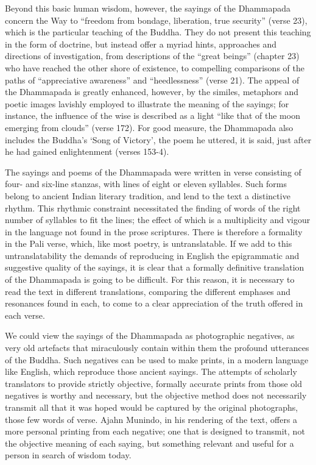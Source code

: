 Beyond this basic human wisdom, however, the sayings of the Dhammapada concern the Way to “freedom from bondage, liberation, true security” (verse 23), which is the particular teaching of the Buddha. They do not present this teaching in the form of doctrine, but instead offer a myriad hints, approaches and directions of investigation, from descriptions of the “great beings” (chapter 23) who have reached the other shore of existence, to compelling comparisons of the paths of “appreciative awareness” and “heedlessness” (verse 21). The appeal of the Dhammapada is greatly enhanced, however, by the similes, metaphors and poetic images lavishly employed to illustrate the meaning of the sayings; for instance, the influence of the wise is described as a light “like that of the moon emerging from clouds” (verse 172). For good measure, the Dhammapada also includes the Buddha’s ‘Song of Victory’, the poem he uttered, it is said, just after he had gained enlightenment (verses 153-4).

The sayings and poems of the Dhammapada were written in verse consisting of four- and six-line stanzas, with lines of eight or eleven syllables. Such forms belong to ancient Indian literary tradition, and lend to the text a distinctive rhythm. This rhythmic constraint necessitated the finding of words of the right number of syllables to fit the lines; the effect of which is a multiplicity and vigour in the language not found in the prose scriptures. There is therefore a formality in the Pali verse, which, like most poetry, is untranslatable. If we add to this untranslatability the demands of reproducing in English the epigrammatic and suggestive quality of the sayings, it is clear that a formally definitive translation of the Dhammapada is going to be difficult. For this reason, it is necessary to read the text in different translations, comparing the different emphases and resonances found in each, to come to a clear appreciation of the truth offered in each verse. 

We could view the sayings of the Dhammapada as photographic negatives, as very old artefacts that miraculously contain within them the profound utterances of the Buddha. Such negatives can be used to make prints, in a modern language like English, which reproduce those ancient sayings. The attempts of scholarly translators to provide strictly objective, formally accurate prints from those old negatives is worthy and necessary, but the objective method does not necessarily transmit all that it was hoped would be captured by the original photographs, those few words of verse. Ajahn Munindo, in his rendering of the text, offers a more personal printing from each negative; one that is designed to transmit, not the objective meaning of each saying, but something relevant and useful for a person in search of wisdom today.

